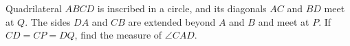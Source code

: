 Quadrilateral $ABCD$ is inscribed in a circle, and its diagonals $AC$ and $BD$ meet at $Q$. The sides $DA$ and $CB$ are extended beyond $A$ and $B$ and meet at $P$. If $CD=CP=DQ$, find the measure of $\angle CAD$.
